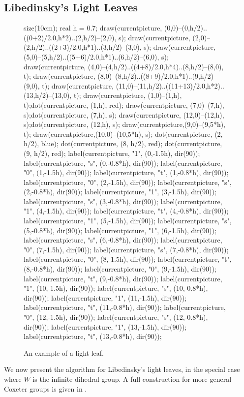 \subsection{Libedinsky's Light Leaves}
\label{sec:prelim_lightleave}
\begin{figure}[ht]
	\centering
	\begin{asy}
	size(10cm);
	real h = 0.7;
	draw(currentpicture, (0,0)--(0,h/2)..((0+2)/2.0,h*2)..(2,h/2)--(2,0), s);
	draw(currentpicture, (2,0)--(2,h/2)..((2+3)/2.0,h*1)..(3,h/2)--(3,0), s);
	draw(currentpicture, (5,0)--(5,h/2)..((5+6)/2.0,h*1)..(6,h/2)--(6,0), s);
	draw(currentpicture, (4,0)--(4,h/2)..((4+8)/2.0,h*4)..(8,h/2)--(8,0), t);
	draw(currentpicture, (8,0)--(8,h/2)..((8+9)/2.0,h*1)..(9,h/2)--(9,0), t);
	draw(currentpicture, (11,0)--(11,h/2)..((11+13)/2.0,h*2)..(13,h/2)--(13,0), t);
	draw(currentpicture, (1,0)--(1,h), t);dot(currentpicture, (1,h), red);
	draw(currentpicture, (7,0)--(7,h), s);dot(currentpicture, (7,h), s);
	draw(currentpicture, (12,0)--(12,h), s);dot(currentpicture, (12,h), s);
	draw(currentpicture,(9,0)--(9,5*h), t);
	draw(currentpicture,(10,0)--(10,5*h), s);
	dot(currentpicture, (2, h/2), blue);
	dot(currentpicture, (8, h/2), red);
	dot(currentpicture, (9, h/2), red);
	label(currentpicture, "1", (0,-1.5h), dir(90));
	label(currentpicture, "s", (0,-0.8*h), dir(90));
	label(currentpicture, "0", (1,-1.5h), dir(90));
	label(currentpicture, "t", (1,-0.8*h), dir(90));
	label(currentpicture, "0", (2,-1.5h), dir(90));
	label(currentpicture, "s", (2,-0.8*h), dir(90));
	label(currentpicture, "1", (3,-1.5h), dir(90));
	label(currentpicture, "s", (3,-0.8*h), dir(90));
	label(currentpicture, "1", (4,-1.5h), dir(90));
	label(currentpicture, "t", (4,-0.8*h), dir(90));
	label(currentpicture, "1", (5,-1.5h), dir(90));
	label(currentpicture, "s", (5,-0.8*h), dir(90));
	label(currentpicture, "1", (6,-1.5h), dir(90));
	label(currentpicture, "s", (6,-0.8*h), dir(90));
	label(currentpicture, "0", (7,-1.5h), dir(90));
	label(currentpicture, "s", (7,-0.8*h), dir(90));
	label(currentpicture, "0", (8,-1.5h), dir(90));
	label(currentpicture, "t", (8,-0.8*h), dir(90));
	label(currentpicture, "0", (9,-1.5h), dir(90));
	label(currentpicture, "t", (9,-0.8*h), dir(90));
	label(currentpicture, "1", (10,-1.5h), dir(90));
	label(currentpicture, "s", (10,-0.8*h), dir(90));
	label(currentpicture, "1", (11,-1.5h), dir(90));
	label(currentpicture, "t", (11,-0.8*h), dir(90));
	label(currentpicture, "0", (12,-1.5h), dir(90));
	label(currentpicture, "s", (12,-0.8*h), dir(90));
	label(currentpicture, "1", (13,-1.5h), dir(90));
	label(currentpicture, "t", (13,-0.8*h), dir(90));
	\end{asy}
	\caption{An example of a light leaf.}
	\label{fig:lightleaf_example}
\end{figure}
We now present the algorithm for Libedinsky's light leaves, in the special case where $W$ is the infinite dihedral group.  A full construction for more general Coxeter groups is given in \cite{ref:gr4all}.

